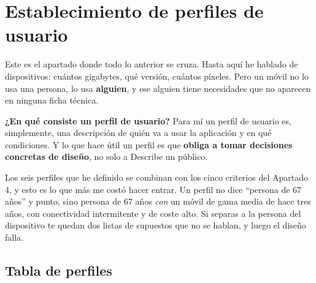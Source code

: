 \documentclass[11pt,a4paper]{article}
\newcommand{\campo}[1]{\textbf{\color{navy}#1}}
\begin{document}
	\section{Establecimiento de perfiles de usuario}
	
	Este es el apartado donde todo lo anterior se cruza. Hasta aquí he hablado de dispositivos: cuántos gigabytes, qué versión, cuántos píxeles. Pero un móvil no lo usa una persona, lo usa \textbf{alguien}, y ese alguien tiene necesidades que no aparecen en ninguna ficha técnica.
	
	\campo{¿En qué consiste un perfil de usuario?}
	Para mí un perfil de usuario es, simplemente, una descripción de quién va a usar la aplicación y en qué condiciones. Y lo que hace útil un perfil es que \textbf{obliga a tomar decisiones concretas de diseño}, no solo a Describe un público.
	
	Los seis perfiles que he definido se combinan con los cinco criterios del Apartado 4, y esto es lo que más me costó hacer entrar. Un perfil no dice \enquote{persona de 67 años} y punto, sino persona de 67 años \emph{con} un móvil de gama media de hace tres años, con conectividad intermitente y de coste alto. Si separas a la persona del dispositivo te quedan dos listas de supuestos que no se hablan, y luego el diseño falla.
	
	\subsection{Tabla de perfiles}
	
\end{document}
